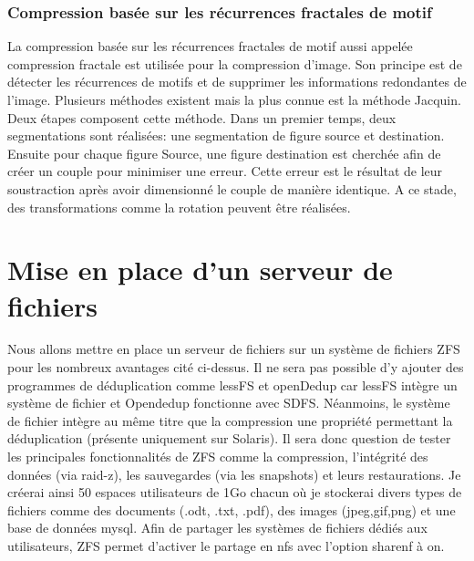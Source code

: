 \documentclass[a4paper]{report}
\begin{document}
	\subsection{Compression basée sur les récurrences fractales de motif}
		La compression basée sur les récurrences fractales de motif aussi appelée compression fractale est utilisée pour la compression d'image. Son principe est de détecter les récurrences de motifs et de supprimer les informations redondantes de l'image. Plusieurs méthodes existent mais la plus connue est la méthode Jacquin. Deux étapes composent cette méthode. Dans un premier temps, deux segmentations sont réalisées: une segmentation de figure source et destination. Ensuite pour chaque figure Source, une figure destination est cherchée afin de créer un couple pour minimiser une erreur. Cette erreur est le résultat de leur soustraction après avoir dimensionné le couple de manière identique. A ce stade, des transformations comme la rotation peuvent être réalisées.
		
         \chapter{Mise en place d'un serveur de fichiers}
		Nous allons mettre en place un serveur de fichiers sur un système de fichiers ZFS pour les nombreux avantages cité ci-dessus. Il ne sera pas possible d'y ajouter des programmes de déduplication comme lessFS et openDedup car lessFS intègre un système de fichier et Opendedup fonctionne avec SDFS. Néanmoins, le système de fichier intègre au même titre que la compression une propriété permettant la déduplication (présente uniquement sur Solaris). Il sera donc question de tester les principales fonctionnalités de ZFS comme la compression, l'intégrité des données (via raid-z), les sauvegardes (via les snapshots) et leurs restaurations. Je créerai ainsi 50 espaces utilisateurs de 1Go chacun où je stockerai divers types de fichiers comme des documents (.odt, .txt, .pdf), des images (jpeg,gif,png) et une base de données mysql. Afin de partager les systèmes de fichiers dédiés aux utilisateurs, ZFS permet d'activer le partage en nfs avec l'option sharenf à on.
\end{document}
